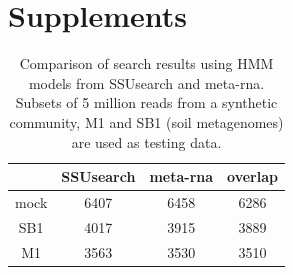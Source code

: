 \documentclass[12pt]{article}
\begin{document}



\section{Supplements}


\begin{table}[tbph!]

 \caption{Comparison of search results using HMM models from SSUsearch
 and meta-rna. Subsets of 5 million reads from a synthetic community,
 M1 and SB1 (soil metagenomes) are used as testing data.}

\label{tab:hmm_comparison}
\begin{tabular}{cccc}
\toprule
     & SSUsearch & meta-rna & overlap \\
\midrule
mock & 6407      & 6458     & 6286 \\
SB1  & 4017      & 3915     & 3889 \\
M1   & 3563      & 3530     & 3510 \\
\bottomrule
\end{tabular}
\end{table}
\end{document}

